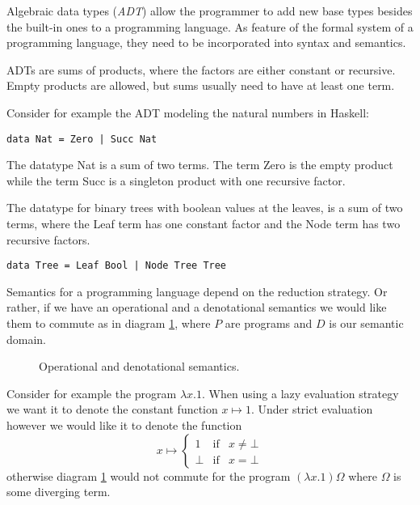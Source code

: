 \documentclass[a4paper]{article}
\begin{document}
Algebraic data types (\emph{ADT}) allow the programmer to add new
base types besides the built-in ones to a programming language. As feature of
the formal system of a programming language, they need to be incorporated into
syntax and semantics.

ADTs are sums of products, where the factors are either constant or recursive.
Empty products are allowed, but sums usually need to have at least one term.

Consider for example the ADT modeling the natural numbers in Haskell:

\begin{verbatim}
data Nat = Zero | Succ Nat
\end{verbatim}

The datatype Nat is a sum of two terms. The term Zero is the empty product while
the term Succ is a singleton product with one recursive factor.

The datatype for binary trees with boolean values at the leaves, is a sum of two
terms, where the Leaf term has one constant factor and the Node term has two
recursive factors.

\begin{verbatim}
data Tree = Leaf Bool | Node Tree Tree
\end{verbatim}

Semantics for a programming language depend on the reduction strategy. Or
rather, if we have an operational and a denotational semantics we would like
them to commute as in diagram \ref{figOperateDenoteSemantics}, where $P$ are
programs and $D$ is our semantic domain.

\begin{figure}[h]
\begin{center}
\end{center}
\caption{Operational and denotational semantics.}
\label{figOperateDenoteSemantics}
\end{figure}

Consider for example the program $\lambda x . 1$. When using a lazy evaluation
strategy we want it to denote the constant function $x \mapsto 1$. Under strict
evaluation however we would like it to denote the function
\begin{equation*}
x \mapsto \left\{
  \begin{array}{lcl}
   1     & \text{if} & x \neq \bot \\
   \bot  & \text{if} & x = \bot
  \end{array}
\right.
\end{equation*}
otherwise diagram \ref{figOperateDenoteSemantics} would not commute
for the program $(\lambda x . 1)\Omega$ where $\Omega$ is some diverging
term.
\end{document}

